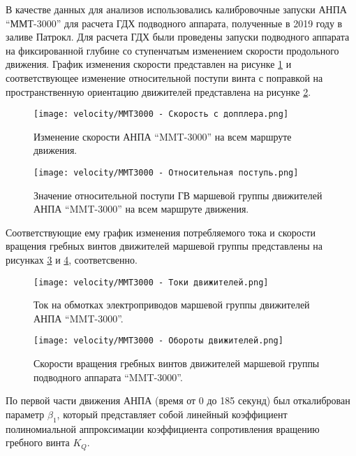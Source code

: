 В качестве данных для анализов использовались калибровочные запуски АНПА ``ММТ-3000'' для расчета ГДХ подводного аппарата, полученные в 2019 году в заливе Патрокл.
Для расчета ГДХ были проведены запуски подводного аппарата на фиксированной глубине со ступенчатым изменением скорости продольного движения.
График изменения скорости представлен на рисунке \ref{fig:mmt3000_velocity} и соответствующее изменение относительной поступи винта с поправкой на пространственную ориентацию движителей представлена на рисунке \ref{fig:advance_ratio}.

\begin{figure}[ht]
    \centering
    \texttt{[image: velocity/MMT3000 - Скорость с допплера.png]}
    \caption{Изменение скорости АНПА ``MMT-3000'' на всем маршруте движения.}
    \label{fig:mmt3000_velocity}
\end{figure}

\begin{figure}[ht]
    \centering
    \texttt{[image: velocity/MMT3000 - Относительная поступь.png]}
    \caption{Значение относительной поступи ГВ маршевой группы движителей АНПА ``MMT-3000'' на всем маршруте движения.}
    \label{fig:advance_ratio}
\end{figure}


Соответствующие ему график изменения потребляемого тока и скорости вращения гребных винтов движителей маршевой группы представлены на рисунках \ref{fig:mmt3000_curent} и  \ref{fig:mmt3000_rotation}, соответсвенно.

\begin{figure}[ht]
    \centering
    \texttt{[image: velocity/MMT3000 - Токи движителей.png]}
    \caption{Ток на обмотках электроприводов маршевой группы движителей АНПА ``MMT-3000''.}
    \label{fig:mmt3000_curent}
\end{figure}

\begin{figure}[ht]
    \centering
    \texttt{[image: velocity/MMT3000 - Обороты движителей.png]}
    \caption{Скорости вращения гребных винтов движителей маршевой группы подводного аппарата ``MMT-3000''.}
    \label{fig:mmt3000_rotation}
\end{figure}

По первой части движения АНПА (время от 0 до 185 секунд) был откалиброван параметр $\beta_1$, который представляет собой линейный коэффициент полиномиальной аппроксимации коэффициента сопротивления вращению гребного винта $K_Q$. 

